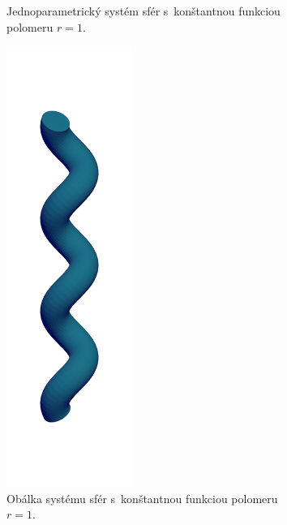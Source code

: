 \documentclass[12pt, twoside]{book}
\begin{document}
\begin{figure}[t!]
\begin{subfigure}[t]{0.32\textwidth}
		\caption{Jednoparametrický systém sfér s~konštantnou funkciou polomeru $r=1.$}
        \label{fig:plocha7}
    \end{subfigure}
    \hfill
    \begin{subfigure}[t]{0.32\textwidth}
        \centering
        \includegraphics[width=0.45\textwidth, trim=0mm 80mm 0mm 80mm, clip=true]{images/helix_envelope.png}
        	\caption{Obálka systému sfér s~konštantnou funkciou polomeru $r=1$.}
        \label{fig:plocha8}
    \end{subfigure}
    \hfill
    \begin{subfigure}[t]{0.32\textwidth}
        \centering

\end{subfigure}
\end{figure}
\end{document}
